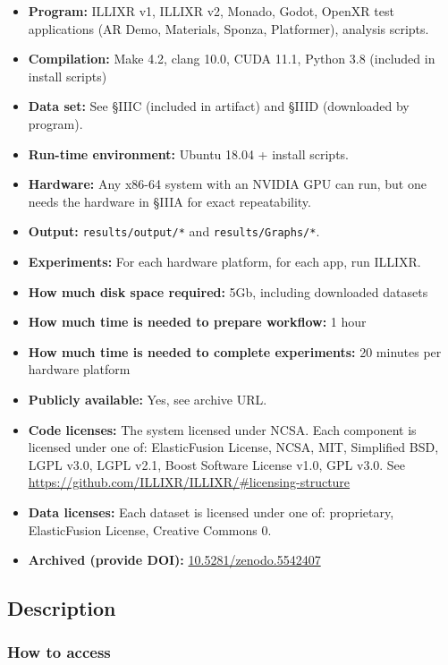 \documentclass{sigplanconf}
\newcommand{\zenodo}{\footnotesize \url{10.5281/zenodo.5542407}}
\begin{document}
{\small
\begin{itemize}
  \item {\bf Program: } ILLIXR v1, ILLIXR v2, Monado, Godot, OpenXR test applications (AR Demo, Materials, Sponza, Platformer), analysis scripts.
  \item {\bf Compilation: } Make 4.2, clang 10.0, CUDA 11.1, Python 3.8 (included in install scripts)
  \item {\bf Data set: } See \S IIIC (included in artifact) and \S IIID (downloaded by program).
  \item {\bf Run-time environment: } Ubuntu 18.04 + install scripts.
  \item {\bf Hardware: } Any x86-64 system with an NVIDIA GPU can run, but one needs the hardware in \S IIIA for exact repeatability.
  \item {\bf Output: } \texttt{results/output/*} and \texttt{results/Graphs/*}.
  \item {\bf Experiments: } For each hardware platform, for each app, run ILLIXR.
  \item {\bf How much disk space required: } 5Gb, including downloaded datasets
  \item {\bf How much time is needed to prepare workflow: } 1 hour
  \item {\bf How much time is needed to complete experiments: } 20 minutes per hardware platform
  \item {\bf Publicly available: } Yes, see archive URL.
  \item {\bf Code licenses: } The system licensed under NCSA. Each component is licensed under one of: ElasticFusion License, NCSA, MIT, Simplified BSD, LGPL v3.0, LGPL v2.1, Boost Software License v1.0, GPL v3.0. See {\footnotesize \url{https://github.com/ILLIXR/ILLIXR/\#licensing-structure}}
  \item {\bf Data licenses: } Each dataset is licensed under one of: proprietary, ElasticFusion License, Creative Commons 0.
  \item {\bf Archived (provide DOI): } \zenodo
\end{itemize}
}

\subsection{Description}

\subsubsection{How to access}
\end{document}
